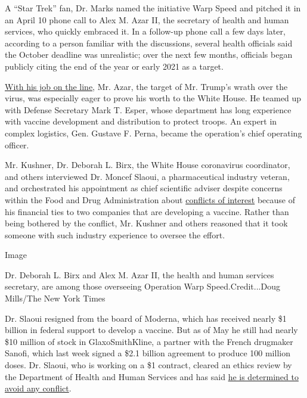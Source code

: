 A ``Star Trek'' fan, Dr. Marks named the initiative Warp Speed and
pitched it in an April 10 phone call to Alex M. Azar II, the secretary
of health and human services, who quickly embraced it. In a follow-up
phone call a few days later, according to a person familiar with the
discussions, several health officials said the October deadline was
unrealistic; over the next few months, officials began publicly citing
the end of the year or early 2021 as a target.

\href{https://www.nytimes3xbfgragh.onion/2020/04/29/us/politics/coronavirus-trump-azar.html}{With
his job on the line}, Mr. Azar, the target of Mr. Trump's wrath over the
virus\href{https://www.nytimes3xbfgragh.onion/2020/04/29/us/politics/coronavirus-trump-azar.html}{,}
was especially eager to prove his worth to the White House. He teamed up
with Defense Secretary Mark T. Esper, whose department has long
experience with vaccine development and distribution to protect troops.
An expert in complex logistics, Gen. Gustave F. Perna, became the
operation's chief operating officer.

Mr. Kushner, Dr. Deborah L. Birx, the White House coronavirus
coordinator, and others interviewed Dr. Moncef Slaoui, a pharmaceutical
industry veteran, and orchestrated his appointment as chief scientific
adviser despite concerns within the Food and Drug Administration about
\href{https://www.nytimes3xbfgragh.onion/2020/07/15/us/politics/vaccine-Slaoui-coronavirus-trump.html}{conflicts
of interest} because of his financial ties to two companies that are
developing a vaccine. Rather than being bothered by the conflict, Mr.
Kushner and others reasoned that it took someone with such industry
experience to oversee the effort.

Image

Dr. Deborah L. Birx and Alex M. Azar II, the health and human services
secretary, are among those overseeing Operation Warp Speed.Credit...Doug
Mills/The New York Times

Dr. Slaoui resigned from the board of Moderna, which has received nearly
\$1 billion in federal support to develop a vaccine. But as of May he
still had nearly \$10 million of stock in GlaxoSmithKline, a partner
with the French drugmaker Sanofi, which last week signed a \$2.1 billion
agreement to produce 100 million doses. Dr. Slaoui, who is working on a
\$1 contract, cleared an ethics review by the Department of Health and
Human Services and has said
\href{https://www.nytimes3xbfgragh.onion/2020/05/20/health/coronavirus-vaccine-czar.html}{he
is determined to avoid any conflict}.

